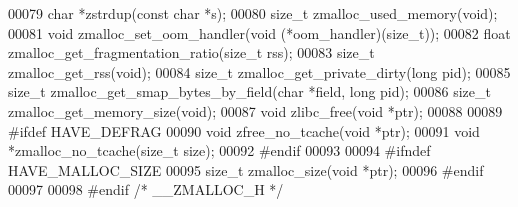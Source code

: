 \begin{DoxyCode}
00079 \textcolor{keywordtype}{char} *zstrdup(\textcolor{keyword}{const} \textcolor{keywordtype}{char} *s);
00080 size\_t zmalloc\_used\_memory(\textcolor{keywordtype}{void});
00081 \textcolor{keywordtype}{void} zmalloc\_set\_oom\_handler(\textcolor{keywordtype}{void} (*oom\_handler)(size\_t));
00082 \textcolor{keywordtype}{float} zmalloc\_get\_fragmentation\_ratio(size\_t rss);
00083 size\_t zmalloc\_get\_rss(\textcolor{keywordtype}{void});
00084 size\_t zmalloc\_get\_private\_dirty(\textcolor{keywordtype}{long} pid);
00085 size\_t zmalloc\_get\_smap\_bytes\_by\_field(\textcolor{keywordtype}{char} *field, \textcolor{keywordtype}{long} pid);
00086 size\_t zmalloc\_get\_memory\_size(\textcolor{keywordtype}{void});
00087 \textcolor{keywordtype}{void} zlibc\_free(\textcolor{keywordtype}{void} *ptr);
00088 
00089 \textcolor{preprocessor}{#}\textcolor{preprocessor}{ifdef} \textcolor{preprocessor}{HAVE\_DEFRAG}
00090 \textcolor{keywordtype}{void} zfree\_no\_tcache(\textcolor{keywordtype}{void} *ptr);
00091 \textcolor{keywordtype}{void} *zmalloc\_no\_tcache(size\_t size);
00092 \textcolor{preprocessor}{#}\textcolor{preprocessor}{endif}
00093 
00094 \textcolor{preprocessor}{#}\textcolor{preprocessor}{ifndef} \textcolor{preprocessor}{HAVE\_MALLOC\_SIZE}
00095 size\_t zmalloc\_size(\textcolor{keywordtype}{void} *ptr);
00096 \textcolor{preprocessor}{#}\textcolor{preprocessor}{endif}
00097 
00098 \textcolor{preprocessor}{#}\textcolor{preprocessor}{endif} \textcolor{comment}{/* \_\_ZMALLOC\_H */}
\end{DoxyCode}

